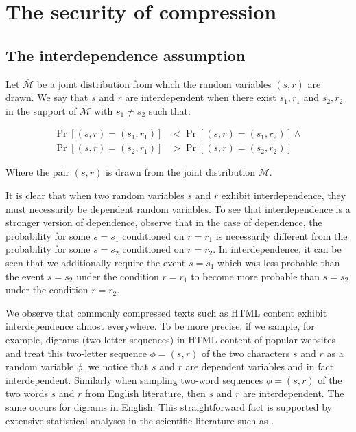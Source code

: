 \documentclass[conference, letterpaper, 10pt]{IEEEtran}
\begin{document}
\section{The security of compression}\label{sec:comsec}

\subsection{The interdependence assumption}\label{subsec:interdependence}

Let $\bar{\mathcal{M}}$ be a joint distribution from which the random variables
$(s, r)$ are drawn. We say that $s$ and $r$ are interdependent when there exist
$s_1, r_1$ and $s_2, r_2$ in the support of $\bar{\mathcal{M}}$ with $s_1 \neq
s_2$ such that:

\begin{align*}
    \Pr[(s, r) = (s_1, r_1)] &< \Pr[(s, r) = (s_1, r_2)]
\land\\
    \Pr[(s, r) = (s_2, r_1)] &> \Pr[(s, r) = (s_2, r_2)]
\end{align*}

Where the pair $(s, r)$ is drawn from the joint distribution
$\bar{\mathcal{M}}$.

It is clear that when two random variables $s$ and $r$ exhibit interdependence,
they must necessarily be dependent random variables. To see that
interdependence is a stronger version of dependence, observe that in the case
of dependence, the probability for some $s = s_1$ conditioned on $r = r_1$ is
necessarily different from the probability for some $s = s_2$ conditioned on $r
= r_2$. In interdependence, it can be seen that we additionally require the
event $s = s_1$ which was less probable than the event $s = s_2$ under the
condition $r = r_1$ to become more probable than $s = s_2$ under the condition
$r = r_2$.

We observe that commonly compressed texts such as HTML content exhibit
interdependence almost everywhere. To be more precise, if we sample, for
example, digrams (two-letter sequences) in HTML content of popular websites and
treat this two-letter sequence $\phi = (s, r)$ of the two characters $s$ and
$r$ as a random variable $\phi$, we notice that $s$ and $r$ are dependent
variables and in fact interdependent. Similarly when sampling two-word sequences
$\phi = (s, r)$ of the two words $s$ and $r$ from English literature, then $s$
and $r$ are interdependent. The same occurs for digrams in English. This
straightforward fact is supported by extensive statistical analyses in the
scientific literature such as \cite{c6}.
\end{document}
